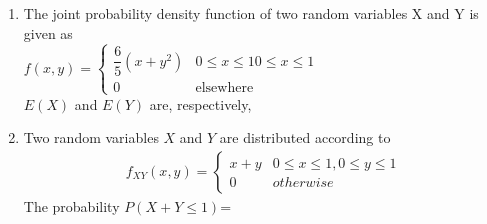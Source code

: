 \begin{enumerate}[label=\thesection.\arabic*.,ref=\thesection.\theenumi]
            \begin{enumerate}
            \end{enumerate}
            \solution
                    


            \item The joint probability density function of two random variables X and Y is given as \\
            $
            f(x,y)=
            \begin{cases}
            \dfrac{6}{5}(x+y^2)
            & 0 \leqslant x \leqslant 1  0 \leqslant x \leqslant 1 \\
            0 & \text{elsewhere}
            \end{cases}
            $\\
            $E(X)$ and $E(Y)$ are, respectively,
            
            \begin{enumerate}
            \end{enumerate}
            \solution
            
            
%
\item Two random variables  $X$ and $Y$ are distributed according to 
\begin{align}
f_{XY}(x,y)=  \begin{cases}
    x+y & 0\leq x \leq 1, 0\leq y \leq 1 \\
    0 & otherwise
\end{cases}
\end{align}
The probability $P(X+Y \leq 1)$=
%
\solution
% 


\end{enumerate}

